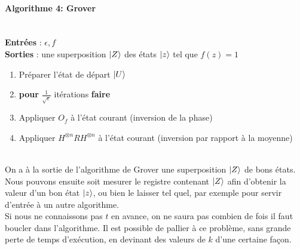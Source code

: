 \documentclass[12pt,openany]{report}
\DeclarePairedDelimiter\ket{\lvert}{\rangle}
\begin{document}
\begin{boxedminipage}[ poslb ]{15cm}
\paragraph{Algorithme 4: Grover }\cite{Ghazal}\\

\textbf{Entrées} : $\epsilon , f$\\
\hspace{0.4cm}\textbf{Sorties} : une superposition $\ket{Z}$ des états $\ket{z}$ tel que $ f(z)=1 $\\
\begin{enumerate}


\item Préparer l'état de départ $\ket{U}$
\item  \textbf{pour} $\frac{1}{\sqrt{\epsilon}}$ itérations \textbf{faire}
\item \hspace{0.3cm} Appliquer $O_f$ à l'état courant (inversion de la phase)
\item \hspace{0.3cm} Appliquer $\mathit{H}^{\otimes n}\mathit{R} \mathit{H}^{\otimes n}  $ à l'état courant (inversion par rapport à la moyenne)
\end{enumerate}

\end{boxedminipage}
\vspace{0.5cm}
\\
On a à la sortie de l’algorithme de Grover une superposition $\ket{Z}$ de bons états. Nous pouvons ensuite soit mesurer le registre contenant $\ket{Z}$ afin d’obtenir
la valeur d’un bon état $\ket{z}$, ou bien le laisser tel quel, par exemple pour servir d’entrée à un autre algorithme.\\
Si nous ne connaissons pas $t$ en avance, on ne saura pas combien de fois il faut boucler dans l’algorithme. Il est possible de pallier à ce problème, sans grande perte de temps d’exécution, en devinant des valeurs de $k$ d’une certaine
façon.
\end{document}
